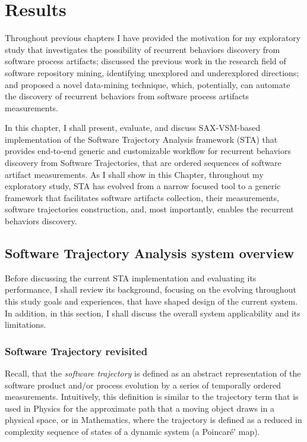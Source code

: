\chapter{Results}\label{chapter_sta}
Throughout previous chapters I have provided the motivation for my exploratory study that investigates the possibility of recurrent behaviors discovery from software process artifacts; discussed the previous work in the research field of software repository mining, identifying unexplored and underexplored directions; and proposed a novel data-mining technique, which, potentially, can automate the discovery of recurrent behaviors from software process artifacts measurements.

In this chapter, I shall present, evaluate, and discuss \mbox{SAX-VSM}-based implementation of the Software Trajectory Analysis  framework (STA) that provides end-to-end generic and customizable workflow for recurrent behaviors discovery from Software Trajectories, that are ordered sequences of software artifact measurements. 
As I shall show in this Chapter, throughout my exploratory study, STA has evolved from a narrow focused tool to a generic framework that facilitates software artifacts collection, their measurements, software trajectories construction, and, most importantly, enables the recurrent behaviors discovery.

\section{Software Trajectory Analysis system overview}
Before discussing the current STA implementation and evaluating its performance, I shall review its background, focusing on the evolving throughout this study goals and experiences, that have shaped design of the current system. In addition, in this section, I shall discuss the overall system applicability and its limitations.

\subsection{Software Trajectory revisited}
Recall, that the \textit{software trajectory} is defined as an abstract representation of the software product and/or process evolution by a series of temporally ordered measurements. Intuitively, this definition is similar to the trajectory term that is used in Physics for the approximate path that a moving object draws in a physical space, or in Mathematics, where the trajectory is defined as a reduced in complexity sequence of states of a dynamic system (a Poincar\'{e}' map).

